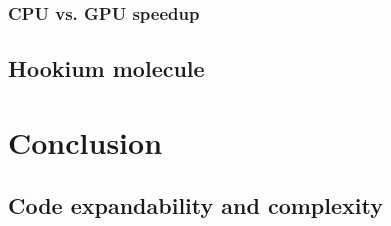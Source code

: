 \documentclass[final,3p,times,twocolumn]{elsarticle}
\begin{document}
	\subsubsection{CPU vs. GPU speedup}
	
	\subsection{Hookium molecule}
	
	
	\newpage
	\section{Conclusion}
	\label{sec:conclusion}
	
	\subsection{Code expandability and complexity}
		
	
	
	
	
	\appendix
\end{document}

